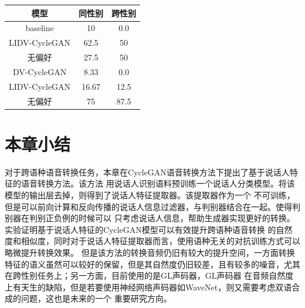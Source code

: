 \begin{table}
    \centering
    \begin{tabular}[t]{ ccc }
        \toprule
        模型  & 同性别 & 跨性别   \\
        \midrule
        baseline    & 10 & 0.0           \\
        LIDV-CycleGAN    & 62.5 & 50           \\
        无偏好    & 27.5 & 50           \\
        \midrule
        DV-CycleGAN    & 8.33 & 0.0           \\
        LIDV-CycleGAN    & 16.67 & 12.5           \\
        无偏好 & 75 & 87.5           \\
        \bottomrule
        \end{tabular} 
    \label{tab:simtable}
\end{table}

\section{本章小结}
对于跨语种语音转换任务，本章在CycleGAN语音转换方法下提出了基于说话人特征的语音转换方法。该方法
用说话人识别语料预训练一个说话人分类模型。将该模型的输出层去掉，则得到了说话人特征提取器。该提取器作为一个
不可训练，但是可以前向计算和反向传播的说话人信息过滤器，与判别器结合在一起。使得判别器在判别正负例的时候可以
只考虑说话人信息，帮助生成器实现更好的转换。实验证明基于说话人特征的CycleGAN模型可以有效提升跨语种语音转换
的自然度和相似度，同时对于说话人特征提取器而言，使用语种无关的对抗训练方式可以略微提升转换效果。
但是该方法的转换音频仍旧有较大的提升空间，一方面转换特征的语义虽然可以较好的保留，但是其自然度仍旧较差，且有较多的噪音，尤其在跨性别任务上；另一方面，目前使用的是GL声码器，GL声码器
在音频自然度上有天生的缺陷，但是若要使用神经网络声码器如WaveNet，则又需要考虑双语合成的问题，这也是未来的一个
重要研究方向。